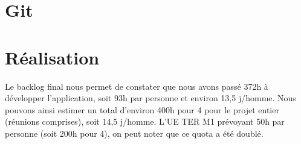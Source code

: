 \section{Git}


\section{Réalisation}
Le backlog final nous permet de constater que nous avons passé 372h à développer l'application, soit 93h par personne et environ 13,5 j/homme.
Nous pouvons ainsi estimer un total d'environ 400h pour 4 pour le projet entier (réunions comprises), soit 14,5 j/homme.
L'UE TER M1 prévoyant 50h par personne (soit 200h pour 4), on peut noter que ce quota a été doublé.
